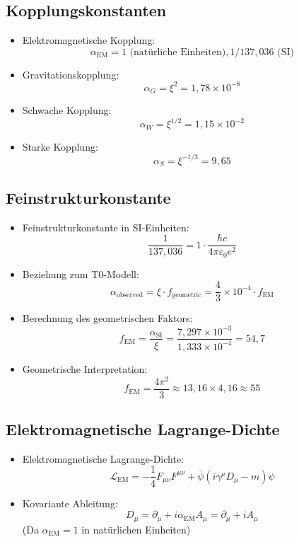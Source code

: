 \documentclass[12pt,a4paper]{article}
\begin{document}
	\subsection{Kopplungskonstanten}
\begin{itemize}
	\item Elektromagnetische Kopplung:
	$$\alpha_{\text{EM}} = 1 \text{ (nat\"{u}rliche Einheiten)}, 1/137,036 \text{ (SI)}$$
	
	\item Gravitationskopplung:
	$$\alpha_G = \xi^2 = 1,78 \times 10^{-8}$$
	
	\item Schwache Kopplung:
	$$\alpha_W = \xi^{1/2} = 1,15 \times 10^{-2}$$
	
	\item Starke Kopplung:
	$$\alpha_S = \xi^{-1/3} = 9,65$$
\end{itemize}

	\subsection{Feinstrukturkonstante}
	\begin{itemize}
		\item Feinstrukturkonstante in SI-Einheiten:
		$$\frac{1}{137,036} = 1 \cdot \frac{\hbar c}{4\pi\varepsilon_0 e^2}$$
		
		\item Beziehung zum T0-Modell:
		$$\alpha_{\text{observed}} = \xi \cdot f_{\text{geometric}} = \frac{4}{3} \times 10^{-4} \cdot f_{\text{EM}}$$
		
		\item Berechnung des geometrischen Faktors:
		$$f_{\text{EM}} = \frac{\alpha_{\text{SI}}}{\xi} = \frac{7,297 \times 10^{-3}}{1,333 \times 10^{-4}} = 54,7$$
		
		\item Geometrische Interpretation:
		$$f_{\text{EM}} = \frac{4\pi^2}{3} \approx 13,16 \times 4,16 \approx 55$$
	\end{itemize}
	
	\subsection{Elektromagnetische Lagrange-Dichte}
	\begin{itemize}
		\item Elektromagnetische Lagrange-Dichte:
		$$\mathcal{L}_{\text{EM}} = -\frac{1}{4}F_{\mu\nu}F^{\mu\nu} + \bar{\psi}(i\gamma^\mu D_\mu - m)\psi$$
		
		\item Kovariante Ableitung:
		$$D_\mu = \partial_\mu + i \alpha_{\text{EM}} A_\mu = \partial_\mu + i A_\mu$$
		(Da $\alpha_{\text{EM}} = 1$ in nat\"{u}rlichen Einheiten)
	\end{itemize}
	
\end{document}
